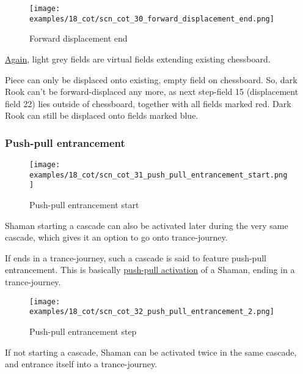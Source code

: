 \clearpage %

\noindent
\begin{figure}[!h]
\texttt{[image: examples/18\_cot/scn\_cot\_30\_forward\_displacement\_end.png]}
\caption{Forward displacement end}
\label{fig:scn_cot_30_forward_displacement_end}
\end{figure}

\hyperref[fig:scn_hd_04_centaur_off_board]{Again},
light grey fields are virtual fields extending existing chessboard.

Piece can only be displaced onto existing, empty field on chessboard. So, dark Rook can't be
forward-displaced any more, as next step-field 15 (displacement field 22) lies outside of
chessboard, together with all fields marked red. Dark Rook can still be displaced onto fields
marked blue.

\clearpage %

\subsubsection*{Push-pull entrancement}

\noindent
\begin{wrapfigure}[9]{l}{0.4\textwidth}
\centering
\texttt{[image: examples/18\_cot/scn\_cot\_31\_push\_pull\_entrancement\_start.png]}
\caption{Push-pull entrancement start}
\label{fig:star/scn_cot_31_push_pull_entrancement_start}
\end{wrapfigure}
Shaman starting a cascade can also be activated later during the very same cascade, which gives it an
option to go onto trance-journey.

If ends in a trance-journey, such a cascade is said to feature push-pull entrancement. This is basically
\hyperref[txt:Miranda's veil/Cascading Waves/Push-pull activation]{push-pull activation} of a Shaman,
ending in a trance-journey.

\vspace*{0.05\textheight}
\noindent
\begin{wrapfigure}[11]{l}{0.4\textwidth}
\centering
\texttt{[image: examples/18\_cot/scn\_cot\_32\_push\_pull\_entrancement\_2.png]}
\caption{Push-pull entrancement step}
\label{fig:star/scn_cot_32_push_pull_entrancement_2}
\end{wrapfigure}
If not starting a cascade, Shaman can be activated twice in the same cascade, and entrance itself
into a trance-journey.


